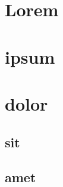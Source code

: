 \documentclass{article}
\begin{document}
\tableofcontents
\section{Lorem}
\section{ipsum}
\section{dolor}
\subsection{sit}
\subsection{amet}
\end{document}
